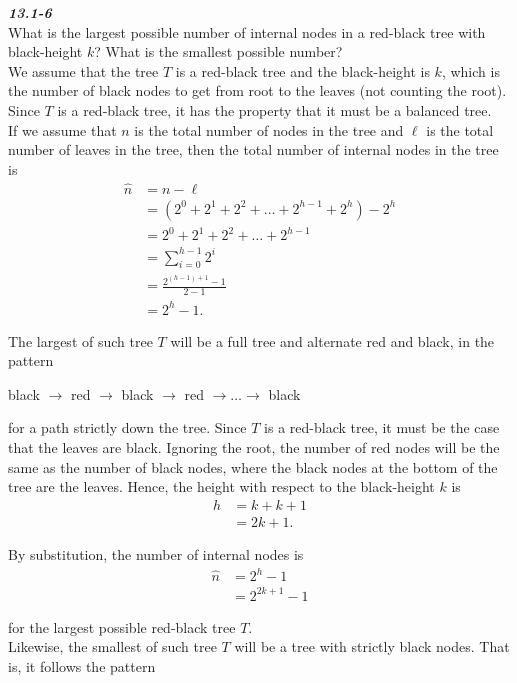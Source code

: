 \documentclass{article}
\begin{document}
\textbf{\textit{13.1-6}}\\
What is the largest possible number of internal nodes in a red-black tree with black-height $k$? What is the smallest possible number?\\

We assume that the tree $T$ is a red-black tree and the black-height is $k$, which is the number of black nodes to get from root to the leaves (not counting the root). Since $T$ is a red-black tree, it has the property that it must be a balanced tree.\\

If we assume that $n$ is the total number of nodes in the tree and $\ell$ is the total number of leaves in the tree, then the total number of internal nodes in the tree is
\begin{align*}
\hat{n} &= n - \ell\\
&= (2^0 + 2^1 + 2^2 + \ldots + 2^{h - 1} + 2^h) - 2^h\\
&= 2^0 + 2^1 + 2^2 + \ldots + 2^{h - 1}\\
&= \sum_{i=0}^{h - 1} 2^{i}\\
&= \frac{2^{(h - 1) + 1} - 1}{2 - 1}\\
&= 2^h - 1.
\end{align*}

The largest of such tree $T$ will be a full tree and alternate red and black, in the pattern

\centerline{black $\rightarrow$ red $\rightarrow$ black $\rightarrow$ red $\rightarrow \ldots \rightarrow$ black}

for a path strictly down the tree. Since $T$ is a red-black tree, it must be the case that the leaves are black. Ignoring the root, the number of red nodes will be the same as the number of black nodes, where the black nodes at the bottom of the tree are the leaves. Hence, the height with respect to the black-height $k$ is
\begin{align*}
h &= k + k + 1\\
&= 2k + 1.
\end{align*}

By substitution, the number of internal nodes is
\begin{align*}
\hat{n} &= 2^h - 1\\
&= 2^{2k + 1} - 1
\end{align*}

for the largest possible red-black tree $T$.\\

Likewise, the smallest of such tree $T$ will be a tree with strictly black nodes. That is, it follows the pattern
\end{document}
